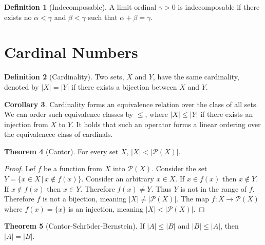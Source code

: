 \documentclass{article}
\theoremstyle{definition}
\newtheorem{thm}{Theorem}[section]
\newtheorem{crly}[thm]{Corollary}
\newtheorem{defn}[thm]{Definition}
\newcommand{\powset}[1]{\mathcal{P}(#1)}
\newcommand{\abs}[1]{\lvert#1\rvert}
\begin{document}
\begin{defn}[Indecomposable]
    A limit ordinal $\gamma > 0$ is indecomposable if there exists no $\alpha < \gamma$ and $\beta < \gamma$ such that $\alpha + \beta = \gamma$.
\end{defn}

\section{Cardinal Numbers}

\begin{defn}[Cardinality]
    Two sets, $X$ and $Y$, have the same cardinality, denoted by $\abs{X} = \abs{Y}$ if there exists a bijection between $X$ and $Y$.
\end{defn}

\begin{crly}
    Cardinality forms an equivalence relation over the class of all sets. We can order such equivalence classes by $\le$, where $\abs{X} \le \abs{Y}$ if there exists an injection from $X$ to $Y$. It holds that such an operator forms a linear ordering over the equivalencce class of cardinals.
\end{crly}

\begin{thm}[Cantor]
    For every set $X$, $\abs{X} < \abs{\powset{X}}$.
\end{thm}

\begin{proof}
    Lef $f$ be a function from $X$ into $\powset{X}$. Consider the set $Y = \{x \in X \, | \, x \not\in f(x) \}$. Consider an arbitrary $x \in X$. If $x \in f(x)$ then $x \not\in Y$. If $x \not\in f(x)$ then $x \in Y$. Therefore $f(x) \ne Y$. Thus $Y$ is not in the range of $f$. Therefore $f$ is not a bijection, meaning $\abs{X} \ne \abs{\powset{X}}$. The map $f: X \to \powset{X}$ where $f(x) = \{x\}$ is an injection, meaning $\abs{X} < \abs{\powset{X}}$.
\end{proof}

\begin{thm}[Cantor-Schr{\"o}der-Bernstein]
    If $\abs{A} \le \abs{B}$ and $\abs{B} \le \abs{A}$, then $\abs{A} = \abs{B}$.
\end{thm}
\end{document}
